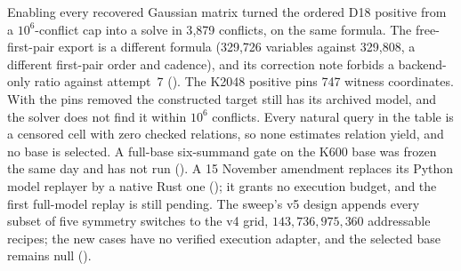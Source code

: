 Enabling every recovered Gaussian matrix turned the ordered D18 positive
from a $10^6$-conflict cap into a solve in 3{,}879 conflicts, on the same
formula. The free-first-pair export is a different formula (329{,}726
variables against 329{,}808, a different first-pair order and cadence), and
its correction note forbids a backend-only ratio against attempt~7
().
The K2048 positive pins 747 witness coordinates. With the pins removed the
constructed target still has its archived model, and the solver does not
find it within $10^6$ conflicts. Every natural query in the table is a
censored cell with zero checked relations, so none estimates relation yield,
and no base is selected. A full-base six-summand gate on the K600 base was
frozen the same day and has not run
().
A 15 November amendment replaces its Python model replayer by a native Rust
one (); it grants no execution
budget, and the first full-model replay is still pending.
The sweep's v5 design appends every subset of five symmetry switches to the
v4 grid, $143{,}736{,}975{,}360$ addressable recipes; the new cases have no
verified execution adapter, and the selected base remains null
().


